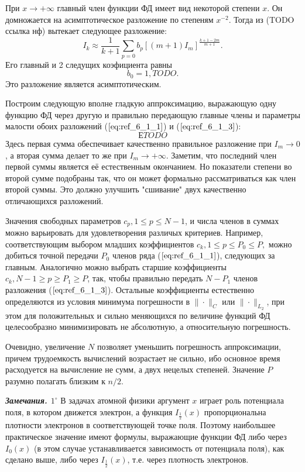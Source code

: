 При $x \to +\infty$ главный член функции ФД имеет вид некоторой степени $x$. Он домножается на асимптотическое разложение по степеням $x^{-2}$. Тогда из (TODO ссылка нф) вытекает следующее разложение:
\begin{equation}
I_k \approx \frac{1}{k+1} \sum\limits_{p=0} b_p[(m+1)I_m]^{\frac{k+1-2m}{m+1}}.
\label{eq:ref_6_1_3}
\end{equation} 
Его главный и 2 следущих коэфициента равны
\begin{equation}
b_0=1, TODO.
\label{eq:ref_6_1_4}
\end{equation} 
Это разложение является асимптотическим.

Построим следующую вполне гладкую аппроксимацию, выражающую одну функцию ФД через другую и правильно передающую главные члены и параметры малости обоих разложений ($\ref{eq:ref_6_1_1}$) и ($\ref{eq:ref_6_1_3}$):
\begin{equation}
ЕTODO
\label{eq:ref_6_1_5}
\end{equation}
Здесь первая сумма обеспечивает качественно правильное разложение при $I_m \to 0$, а вторая сумма делает то же при $I_m \to +\infty$. Заметим, что последний член первой суммы является её естественным окончанием. Но показатели степени во второй сумме подобраны так, что он может формально рассматриваться как член второй суммы. Это должно улучшить "сшивание" двух качественно отличающихся разложений. 

Значения свободных параметров $c_p,1 \leqslant p \leqslant N-1$, и числа членов в суммах можно варьировать для удовлетворения различых критериев. Например, соответствующим выбором младших коэффициентов $c_k,1 \leqslant p \leqslant P_0 \leqslant P,$ можно добиться точной передачи $P_0$ членов ряда ($\ref{eq:ref_6_1_1}$), следующих за главным. Аналогично можно выбрать старшие коэффициенты $c_k,N-1 \geqslant p \geqslant P_1 \geqslant P$, так, чтобы правильно передать $N-P_1$ членов разложения ($\ref{eq:ref_6_1_3}$). Остальные коэффициенты естественно определяются из условия минимума погрешности в $\| \cdot \|_C$ или $\| \cdot \|_{L_2}$, при этом для положительных и сильно меняющихся по величине функций ФД целесообразно минимизировать не абсолютную, а относительную погрешность.

Очевидно, увеличение $N$ позволяет уменьшить погрешность аппроксимации, причем трудоемкость вычислений возрастает не сильно, ибо основное время расходуется на вычисление не сумм, а двух нецелых степеней. Значение $P$ разумно полагать близким к $n/2$.

\textbf{\textit{Замечания. $1^{\circ}$}} В задачах атомной физики аргумент $x$ играет роль потенциала поля, в котором движется электрон, а функция $I_{\frac{1}{2}}(x)$ пропорциональна плотности электронов в соответствующей точке поля. Поэтому наибольшее практическое значение имеют формулы, выражающие функции ФД либо через $I_0(x)$ (в этом случае устанавливается зависимость от потенциала поля), как сделано выше, либо через $I_{\frac{1}{2}}(x)$, т.е. через плотность электронов.

